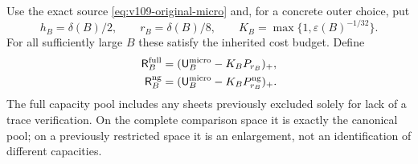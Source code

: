 Use the exact source \eqref{eq:v109-original-micro} and, for a concrete
outer choice, put
\begin{equation}\label{eq:v109-explicit-widths}
 h_B=\delta(B)/2,\qquad r_B=\delta(B)/8,\qquad
 K_B=\max\{1,\varepsilon(B)^{-1/32}\}.
\end{equation}
For all sufficiently large $B$ these satisfy the inherited cost
budget. Define
\begin{equation}\label{eq:v109-two-residuals}
 \begin{split}
 \mathsf R_B^{\rm full}&=
       (\mathsf U_B^{\rm micro}-K_BP_{r_B})_+,\\
 \mathsf R_B^{\rm ng}&=
       (\mathsf U_B^{\rm micro}-K_BP_{r_B}^{\rm ng})_+.
 \end{split}
\end{equation}
The full capacity pool includes any sheets previously excluded solely
for lack of a trace verification. On the complete comparison space
it is exactly the canonical pool; on a previously restricted space
it is an enlargement, not an identification of different capacities.


